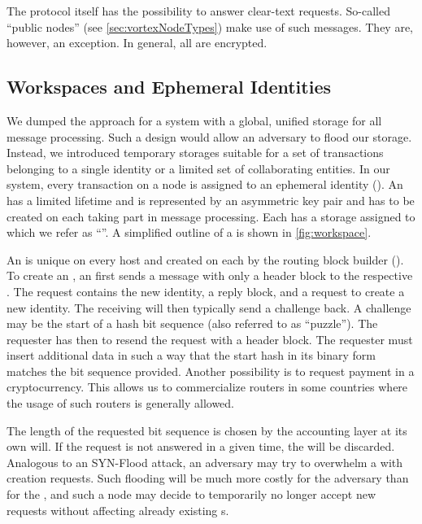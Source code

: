 The protocol itself has the possibility to answer clear-text requests. So-called ``public nodes'' (see \cref{sec:vortexNodeTypes}) make use of such messages. They are, however, an exception. In general, all \VortexMessages{} are encrypted. 

\subsection{Workspaces and Ephemeral Identities}
We dumped the approach for a system with a global, unified storage for all message processing. Such a design would allow an adversary to flood our storage. Instead, we introduced temporary storages suitable for a set of transactions belonging to a single identity or a limited set of collaborating entities. In our system, every transaction on a node is assigned to an ephemeral identity (). An  has a limited lifetime and is represented by an asymmetric key pair and has to be created on each \VortexNode{} taking part in message processing. Each  has a storage assigned to which we refer as ``''. A simplified outline of a  is shown in \cref{fig:workspace}.

An  is unique on every host and created on each \VortexNode{} by the routing block builder (). To create an , an  first sends a message with only a header block to the respective \VortexNode. The request contains the new identity, a reply block, and a request to create a new identity. The receiving \VortexNode{} will then typically send a challenge back. A challenge may be the start of a hash bit sequence (also referred to as ``puzzle''). The requester has then to resend the request with a header block. The requester must insert additional data in such a way that the start hash in its binary form matches the bit sequence provided. Another possibility is to request payment in a cryptocurrency. This allows us to commercialize routers in some countries where the usage of such routers is generally allowed.

The length of the requested bit sequence is chosen by the accounting layer at its own will. If the request is not answered in a given time, the  will be discarded. Analogous to an SYN-Flood attack, an adversary may try to overwhelm a \VortexNode{} with  creation requests. Such flooding will be much more costly for the adversary than for the \VortexNode{}, and such a node may decide to temporarily no longer accept new  requests without affecting already existing s.

